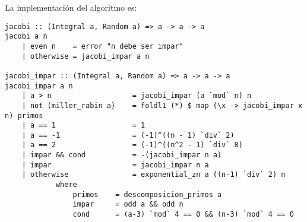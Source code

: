 \documentclass[10pt,spanish]{article}
\begin{document}
La implementación del algoritmo es:

\begin{verbatim}
jacobi :: (Integral a, Random a) => a -> a -> a
jacobi a n
    | even n    = error "n debe ser impar"
    | otherwise = jacobi_impar a n

jacobi_impar :: (Integral a, Random a) => a -> a -> a
jacobi_impar a n
    | a > n                   = jacobi_impar (a `mod` n) n
    | not (miller_rabin a)    = foldl1 (*) $ map (\x -> jacobi_impar x n) primos
    | a == 1                  = 1
    | a == -1                 = (-1)^((n - 1) `div` 2)
    | a == 2                  = (-1)^((n^2 - 1) `div` 8)
    | impar && cond           = -(jacobi_impar n a)
    | impar                   = jacobi_impar n a
    | otherwise               = exponential_zn a ((n-1) `div` 2) n
            where
                primos    = descomposicion_primos a
                impar     = odd a && odd n 
                cond      = (a-3) `mod` 4 == 0 && (n-3) `mod` 4 == 0
\end{verbatim}
\end{document}
